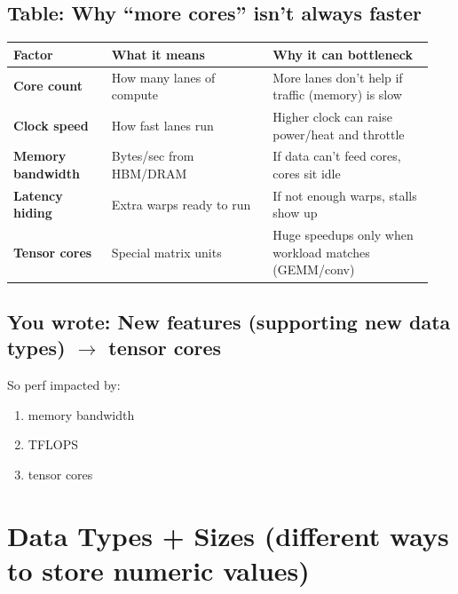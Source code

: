 \documentclass[11pt]{article}
\newcommand{\blue}[1]{\textcolor{myblue}{#1}}
\begin{document}
\subsection*{\blue{Table: Why “more cores” isn’t always faster}}
\begin{center}
\renewcommand{\arraystretch}{1.15}
\begin{tabular}{|>{\bfseries}p{0.22\linewidth}|p{0.36\linewidth}|p{0.36\linewidth}|}
\hline
Factor & What it means & Why it can bottleneck \\
\hline
Core count & How many lanes of compute & More lanes don't help if traffic (memory) is slow \\
\hline
Clock speed & How fast lanes run & Higher clock can raise power/heat and throttle \\
\hline
Memory bandwidth & Bytes/sec from HBM/DRAM & If data can't feed cores, cores sit idle \\
\hline
Latency hiding & Extra warps ready to run & If not enough warps, stalls show up \\
\hline
Tensor cores & Special matrix units & Huge speedups only when workload matches (GEMM/conv) \\
\hline
\end{tabular}
\end{center}

\subsection*{\blue{You wrote: New features (supporting new data types) $\rightarrow$ tensor cores}}
So perf impacted by:
\begin{enumerate}
\item memory bandwidth
\item TFLOPS
\item tensor cores
\end{enumerate}

\section{\blue{Data Types + Sizes (different ways to store numeric values)}}
\end{document}
